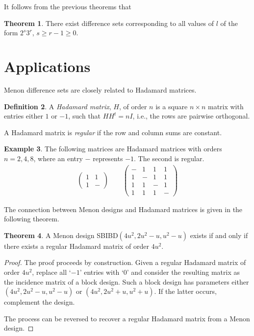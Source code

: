 \documentclass[12pt,a4paper]{article}
\theoremstyle{definition}
\newtheorem{theorem}{Theorem}[section]
\newtheorem{example}[theorem]{Example}
\newtheorem{definition}[theorem]{Definition}
\begin{document}
It follows from the previous theorems that

\begin{theorem}
There exist difference sets corresponding to all values of $l$ of the form $2^s 3^r$, $s \geq r-1 \geq 0$.
\end{theorem}

\section{Applications}

Menon difference sets are closely related to Hadamard matrices\cite{colbourn1996crc}.

\begin{definition}
A \emph{Hadamard matrix}, $H$, of order $n$ is a square $n \times n$ matrix with entries either $1$ or $-1$, such that $HH^t = nI$, i.e., the rows are pairwise orthogonal.

A Hadamard matrix is \emph{regular} if the row and column sums are constant.
\end{definition}

\begin{example}
The following matrices are Hadamard matrices with orders $n = 2, 4, 8$, where an entry $-$ represents $-1$. The second is regular.
\begin{align*}
\begin{pmatrix}
1 & 1 \\
1 & -
\end{pmatrix}
\qquad
\begin{pmatrix}
- & 1 & 1 & 1 \\
1 & - & 1 & 1 \\
1 & 1 & - & 1 \\
1 & 1 & 1 & -
\end{pmatrix}
\end{align*}
\end{example}

The connection between Menon designs and Hadamard matrices is given in the following theorem.

\begin{theorem}
A Menon design SBIBD$(4u^2, 2u^2 - u, u^2 - u)$ exists if and only if there exists a regular Hadamard matrix of order $4u^2$.
\end{theorem}
\begin{proof}
The proof proceeds by construction. Given a regular Hadamard matrix of order $4u^2$, replace all `$-1$' entries with `$0$' and consider the resulting matrix as the incidence matrix of a block design. Such a block design has parameters either $(4u^2, 2u^2 - u, u^2 - u)$ or $(4u^2, 2u^2 + u, u^2 + u)$. If the latter occurs, complement the design.

The process can be reversed to recover a regular Hadamard matrix from a Menon design.
\end{proof}
\end{document}

